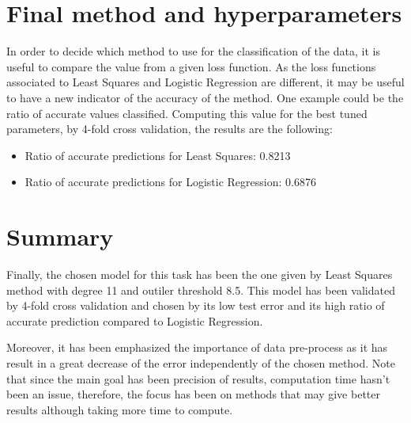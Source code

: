 \documentclass[10pt,conference]{IEEEtran}
\begin{document}
\section{Final method and hyperparameters}

In order to decide which method to use for the classification of the data, it is useful to compare the value from a given loss function. As the loss functions associated to Least Squares and Logistic Regression are different, it may be useful to have a new indicator of the accuracy of the method. One example could be the ratio of accurate values classified. Computing this value for the best tuned parameters, by 4-fold cross validation, the results are the following:

\begin{itemize}
\item{}Ratio of accurate predictions for Least Squares: 0.8213
\item{}Ratio of accurate predictions for Logistic Regression: 0.6876
\end{itemize}

\section{Summary}

Finally, the chosen model for this task has been the one given by Least Squares method with degree 11 and outiler threshold 8.5. This model has been validated by 4-fold cross validation and chosen by its low test error and its high ratio of accurate prediction compared to Logistic Regression. 

Moreover, it has been emphasized the importance of data pre-process as it has result in a great decrease of the error independently of the chosen method. Note that since the main goal has been precision of results, computation time hasn't been an issue, therefore, the focus has been on methods that may give better results although taking more time to compute.
\end{document}
